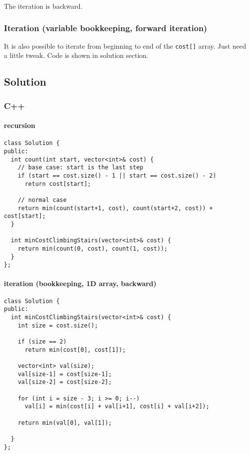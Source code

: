 \documentclass[11pt]{article}
\begin{document}
The iteration is backward.
\subsubsection{Iteration (variable bookkeeping, forward iteration)}
\label{sec:orgafac377}
It is also possible to iterate from beginning to end of the \texttt{cost[]} array. Just need a little tweak. Code is shown in solution section.

\subsection{Solution}
\label{sec:orgea7e332}
\subsubsection{C++}
\label{sec:orgbfed069}
\paragraph{recursion}
\label{sec:org9b40ac3}
\begin{verbatim}
class Solution {
public:
  int count(int start, vector<int>& cost) {
    // base case: start is the last step
    if (start == cost.size() - 1 || start == cost.size() - 2)
      return cost[start];

    // normal case 
    return min(count(start+1, cost), count(start+2, cost)) + cost[start];
  }

  int minCostClimbingStairs(vector<int>& cost) {
    return min(count(0, cost), count(1, cost));
  }
};
\end{verbatim}
\paragraph{iteration (bookkeeping, 1D array, backward)}
\label{sec:org334b5f1}
\begin{verbatim}
class Solution {
public:
  int minCostClimbingStairs(vector<int>& cost) {
    int size = cost.size();

    if (size == 2)
      return min(cost[0], cost[1]);

    vector<int> val(size);
    val[size-1] = cost[size-1];
    val[size-2] = cost[size-2];

    for (int i = size - 3; i >= 0; i--)
      val[i] = min(cost[i] + val[i+1], cost[i] + val[i+2]);

    return min(val[0], val[1]);

  }
};
\end{verbatim}
\end{document}
